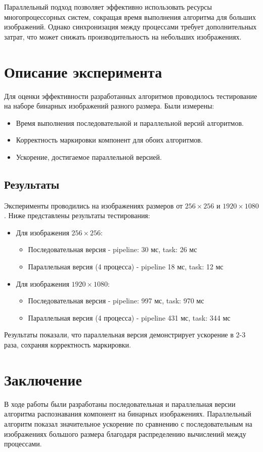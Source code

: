 \documentclass[a4paper,12pt]{article}
\begin{document}
Параллельный подход позволяет эффективно использовать ресурсы многопроцессорных систем, сокращая время выполнения алгоритма для больших изображений. Однако синхронизация между процессами требует дополнительных затрат, что может снижать производительность на небольших изображениях.

\newpage
\section*{Описание эксперимента}
Для оценки эффективности разработанных алгоритмов проводилось тестирование на наборе бинарных изображений разного размера. Были измерены:
\begin{itemize}
\item Время выполнения последовательной и параллельной версий алгоритмов.
\item Корректность маркировки компонент для обоих алгоритмов.
\item Ускорение, достигаемое параллельной версией.
\end{itemize}

\subsection*{Результаты}
Эксперименты проводились на изображениях размеров от $256 \times 256$ и $1920 \times 1080$. Ниже представлены результаты тестирования:
\begin{itemize}
\item Для изображения $256 \times 256$:
\begin{itemize}
\item Последовательная версия - pipeline: 30 мс, task: 26 мс
\item Параллельная версия (4 процесса) - pipeline  18 мс, task: 12 мс
\end{itemize}
\item Для изображения $1920 \times 1080$:
\begin{itemize}
\item Последовательная версия - pipeline: 997 мс, task: 970 мс
\item Параллельная версия (4 процесса) - pipeline  431 мс, task: 344 мс
\end{itemize}
\end{itemize}
Результаты показали, что параллельная версия демонстрирует ускорение в 2-3 раза, сохраняя корректность маркировки.

\newpage
\section*{Заключение}
В ходе работы были разработаны последовательная и параллельная версии алгоритма распознавания компонент на бинарных изображениях. Параллельный алгоритм показал значительное ускорение по сравнению с последовательным на изображениях большого размера благодаря распределению вычислений между процессами.
\end{document}
